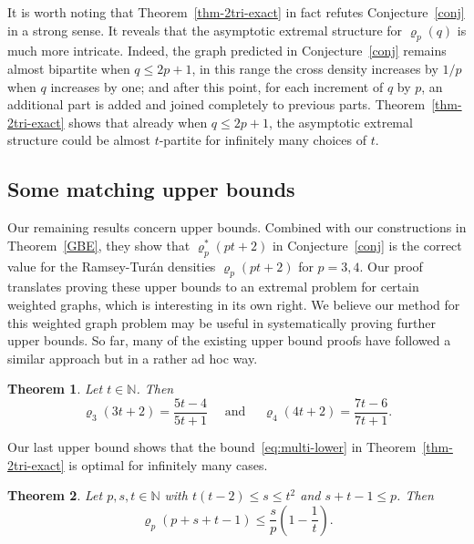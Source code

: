 \documentclass[11pt, a4paper]{article}
\newtheorem{theorem}{Theorem}[section]
\theoremstyle{definition}
\begin{document}
It is worth noting that Theorem~\ref{thm-2tri-exact} in fact refutes Conjecture~\ref{conj} in a strong sense. It reveals that the asymptotic extremal structure for $\varrho_p(q)$ is much more intricate. Indeed, the graph predicted in Conjecture~\ref{conj} remains almost bipartite when $q\le 2p+1$, in this range the cross density increases by $1/p$ when $q$ increases by one; and after this point, for each increment of $q$ by $p$, an additional part is added and joined completely to previous parts. Theorem~\ref{thm-2tri-exact} shows that already when $q\le 2p+1$, the asymptotic extremal structure could be almost $t$-partite for infinitely many choices of $t$.



\subsection{Some matching upper bounds}
Our remaining results concern upper bounds. Combined with our constructions in Theorem~\ref{GBE}, they show that $\varrho_p^*(pt+2)$ in Conjecture~\ref{conj} is the correct value for the Ramsey-Tur\'an densities $\varrho_p(pt+2)$ for $p=3,4$. Our proof translates proving these upper bounds to an extremal problem for certain weighted graphs, which is interesting in its own right. We believe our method for this weighted graph problem may be useful in systematically proving further upper bounds. So far, many of the existing upper bound proofs have followed a similar approach but in a rather ad hoc way.


\begin{theorem}\label{thm-upper-main}
	Let $t\in\mathbb{N}$. Then
	$$\varrho_3(3t+2)=\frac{5t-4}{5t+1} \quad \mbox{ and }\quad \varrho_4(4t+2)=\frac{7t-6}{7t+1}.$$
\end{theorem}





Our last upper bound shows that the bound~\eqref{eq:multi-lower} in Theorem~\ref{thm-2tri-exact} is optimal for infinitely many cases.

\begin{theorem}\label{thm-upper-easy}
	Let $p,s,t\in\mathbb{N}$ with $t(t-2) \leq s \leq t^2$ and $s+t-1 \leq p$.
	Then 
	$$\varrho_p(p+s+t-1) \leq \frac{s}{p}\left(1-\frac{1}{t}\right).$$
\end{theorem}

\end{document}

